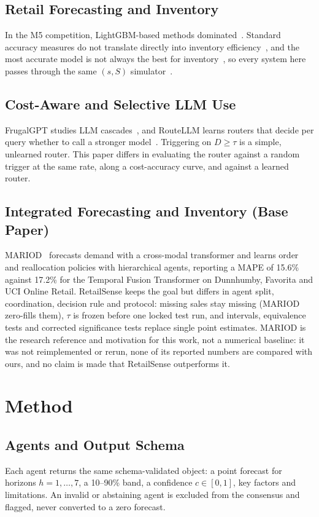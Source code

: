 \documentclass[conference]{IEEEtran}
\begin{document}
\subsection{Retail Forecasting and Inventory}
In the M5 competition, LightGBM-based methods dominated~\cite{makridakis2022}. Standard accuracy
measures do not translate directly into inventory efficiency~\cite{syntetos2010}, and the most
accurate model is not always the best for inventory~\cite{kourentzes2020}, so every system here
passes through the same $(s,S)$ simulator~\cite{silver2017}.

\subsection{Cost-Aware and Selective LLM Use}
FrugalGPT studies LLM cascades~\cite{chen2023}, and RouteLLM learns routers that decide per query
whether to call a stronger model~\cite{ong2025}. Triggering on $D\ge\tau$ is a simple, unlearned
router. This paper differs in evaluating the router against a random trigger at the same rate,
along a cost-accuracy curve, and against a learned router.

\subsection{Integrated Forecasting and Inventory (Base Paper)}
MARIOD~\cite{yang2025} forecasts demand with a cross-modal transformer and learns order and
reallocation policies with hierarchical agents, reporting a MAPE of 15.6\% against 17.2\% for the
Temporal Fusion Transformer on Dunnhumby, Favorita and UCI Online Retail. RetailSense keeps the goal
but differs in agent split, coordination, decision rule and protocol: missing sales stay missing
(MARIOD zero-fills them), $\tau$ is frozen before one locked test run, and intervals, equivalence
tests and corrected significance tests replace single point estimates. MARIOD is the research
reference and motivation for this work, not a numerical baseline: it was not reimplemented or rerun,
none of its reported numbers are compared with ours, and no claim is made that RetailSense outperforms
it.

\section{Method}\label{sec:method}

\subsection{Agents and Output Schema}
Each agent returns the same schema-validated object: a point forecast for horizons $h=1,\dots,7$,
a 10--90\% band, a confidence $c\in[0,1]$, key factors and limitations. An invalid or abstaining
agent is excluded from the consensus and flagged, never converted to a zero forecast.
\end{document}
